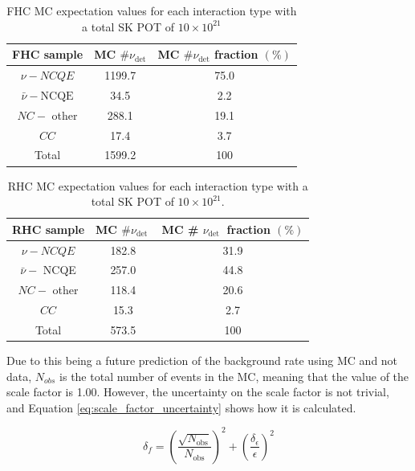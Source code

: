 \begin{table}
    \centering
    \begin{tabular}{||ccc||}
        \hline FHC sample & MC $\# \nu_{\mathrm{det}}$ & MC $\# \nu_{\mathrm{det}}$ fraction $(\%)$ \\
        \hline$\nu-N C Q E$ & 1199.7 & 75.0 \\
        $\bar{\nu}-\mathrm{NCQE}$ & 34.5 & 2.2 \\
        $N C-$ other & 288.1 & 19.1 \\
        $C C$ & 17.4 & 3.7 \\
        \hline Total & 1599.2 & 100 \\
        \hline
        \end{tabular}        
    \caption{FHC MC expectation values for each interaction type with a total SK POT of $10 \times 10^{21}$}
    \label{table:nu_FHC_mc}
\end{table}


\begin{table}
    \centering
    \begin{tabular}{||ccc||}
        \hline RHC sample & MC $\# \nu_{\text {det }}$ & MC \# $\nu_{\text {det }}$ fraction $(\%)$ \\
        \hline$\nu-N C Q E$ & 182.8 & 31.9 \\
        $\bar{\nu}-$ NCQE & 257.0 & 44.8 \\
        $N C-$ other & 118.4 & 20.6 \\
        $C C$ & 15.3 & 2.7 \\
        \hline Total & 573.5 & 100 \\
        \hline
    \end{tabular}
    \caption{RHC MC expectation values for each interaction type with a total SK POT of $10 \times 10^{21}$.}
    \label{table:nu_RHC_mc}
\end{table}

Due to this being a future prediction of the background rate using MC and not data, $N_{obs}$ is the total number of events in the MC, meaning that the value of the scale factor is 1.00. However, the uncertainty on the scale factor is not trivial, and Equation \ref{eq:scale_factor_uncertainty} shows how it is calculated.

\begin{equation}
    \delta_{f} = \left({\frac{\sqrt{N_{\text{obs}}}}{N_{\text{obs}}}}\right)^{2} + \left({\frac{\delta_{\epsilon}}{\epsilon}}\right)^{2}
\label{eq:scale_factor_uncertainty}
\end{equation}

